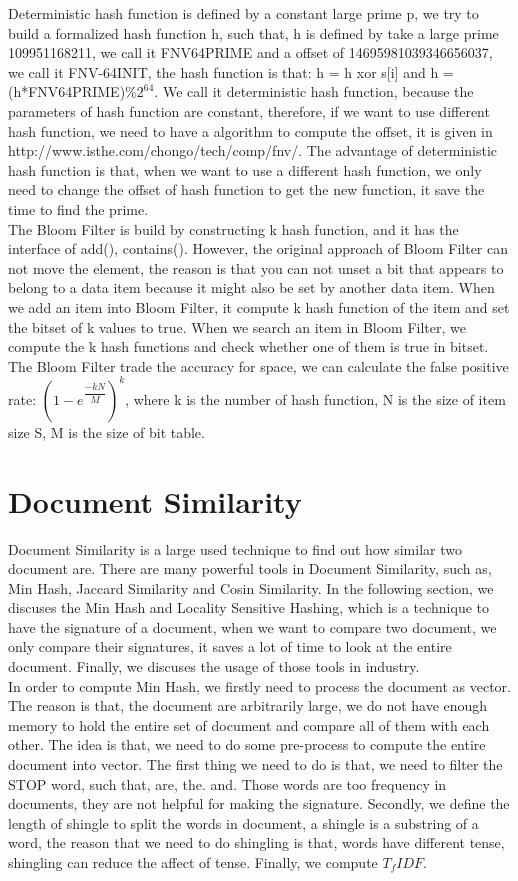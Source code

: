 \documentclass{article}
\begin{document}
Deterministic hash function is defined by a constant large prime p, we try to build a formalized hash function h, such that, h is defined by take a large prime 109951168211, we call it FNV64PRIME and a offset of 14695981039346656037, we call it FNV-64INIT, the hash function is that: h = h xor s[i] and h = (h*FNV64PRIME)$\%2^{64}$. We call it deterministic hash function, because the parameters of hash function are constant, therefore, if we want to use different hash function, we need to have a algorithm to compute the offset, it is given in http://www.isthe.com/chongo/tech/comp/fnv/. The advantage of deterministic hash function is that, when we want to use a different hash function, we only need to change the offset of hash function to get the new function, it save the time to find the prime.\\

The Bloom Filter is build by constructing k hash function, and it has the interface of add(), contains(). However, the original approach of Bloom Filter can not move the element, the reason is that you can not unset a bit that appears to belong to a data item because it might also be set by another data item. When we add an item into Bloom Filter, it compute k hash function of the item and set the bitset of k values to true. When we search an item in Bloom Filter, we compute the k hash functions and check whether one of them is true in bitset. The Bloom Filter trade the accuracy for space, we can calculate the false positive rate: $(1 - e^{\dfrac{-kN}{M}})^{k}$, where k is the number of hash function, N is the size of item size S, M is the size of bit table.


\section{Document Similarity}
Document Similarity is a large used technique to find out how similar two document are. There are many powerful tools in Document Similarity, such as, Min Hash, Jaccard Similarity and Cosin Similarity. In the following section, we discuses the Min Hash and Locality Sensitive Hashing, which is a technique to have the signature of a document, when we want to compare two document, we only compare their signatures, it saves a lot of time to look at the entire document. Finally, we discuses the usage of those tools in industry.\\

In order to compute Min Hash, we firstly need to process the document as vector. The reason is that, the document are arbitrarily large, we do not have enough memory to hold the entire set of document and compare all of them with each other. The idea is that, we need to do some pre-process to compute the entire document into vector. The first thing we need to do is that, we need to filter the STOP word, such that, are, the. and. Those words are too frequency in documents, they are not helpful for making the signature. Secondly, we define the length of shingle to split the words in document, a shingle is a substring of a word, the reason that we need to do shingling is that, words have different tense, shingling can reduce the affect of tense. Finally, we compute $T_{f} IDF$.\\
\end{document}
